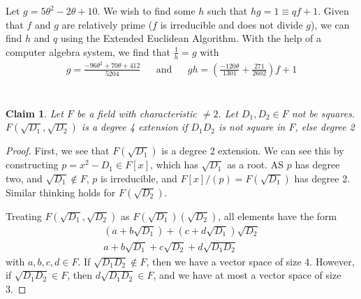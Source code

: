 \documentclass[12pt]{article}
\newtheorem*{claim*}{Claim}
\begin{document}
Let $g = 5\theta^2 - 2\theta + 10$. We wish to find some $h$ such that $hg = 1 \equiv qf + 1$. Given that $f$ and $g$ are relatively prime ($f$ is irreducible and does not divide $g$), we can find $h$ and $q$ using the Extended Euclidean Algorithm. With the help of a computer algebra system, we find that $\frac{1}{h} = g$ with
\begin{align*}
g = \frac{-96 \theta^2 + 70\theta + 412}{5204} 
&& \text{and} && 
gh = \left(\frac{-120\theta}{1301} + \frac{271}{2602}\right)f + 1
\end{align*}


\section{}
\begin{claim*}
Let $F$ be a field with characteristic $\neq 2$. Let $D_1, D_2 \in F$ not be squares. $F(\sqrt{D_1}, \sqrt{D_2})$ is a degree 4 extension if $D_1D_2$ is not square in $F$, else degree 2
\end{claim*}

\begin{proof}
First, we see that $F(\sqrt{D_1})$ is a degree 2 extension. We can see this by constructing $p = x^2 - D_1 \in F[x]$, which has $\sqrt{D_1}$ as a root. AS $p$ has degree two, and $\sqrt{D_1} \notin F$, $p$ is irreducible, and $F[x] / (p) = F(\sqrt{D_1})$ has degree 2. Similar thinking holds for $F(\sqrt{D_2})$.

Treating $F(\sqrt{D_1}, \sqrt{D_2})$ as $F(\sqrt{D_1})(\sqrt{D_2})$, all elements have the form
\begin{align*}
(a + b\sqrt{D_1}) + (c + d\sqrt{D_1})\sqrt{D_2}\\
a + b\sqrt{D_1} + c\sqrt{D_2} + d\sqrt{D_1 D_2}
\end{align*}
with $a,b,c,d \in F$. If $\sqrt{D_1 D_2} \notin F$, then we have a vector space of size 4. However, if $\sqrt{D_1 D_2} \in F$, then $d\sqrt{D_1 D_2} \in F$, and we have at most a vector space of size 3. 
\end{proof}
\end{document}
